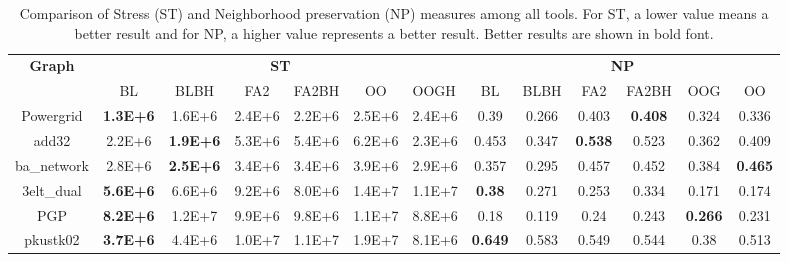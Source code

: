 \documentclass{vgtc}
\newcommand{\toolnameBH}{{BatchLayoutBH}}
\begin{document}

\begin{table}[!t]%
\caption{Comparison of Stress (ST) and Neighborhood preservation (NP) measures among all tools. For ST, a lower value means a better result and for NP, a higher value represents a better result. Better results are shown in bold font.}
\vspace{-4pt}
\centering
\begin{tabular}{|c|c|c|c|c|c|l|c|c|c|c|c|c|}
\hline
\multirow{2}{*}{\textbf{Graph}} & \multicolumn{6}{c|}{\textbf{ST}}                            & \multicolumn{6}{c|}{\textbf{NP}}            \\ \cline{2-13} 
                                & BL       & BLBH     & FA2       & FA2BH & OO & OOGH & BL & BLBH & FA2 & FA2BH & OOG & OO \\ \hline

Powergrid	&	\textbf{1.3E+6}	&	1.6E+6	&	2.4E+6	&	2.2E+6	&	2.5E+6	&	2.4E+6	&		0.39	&	0.266	&	0.403	&	\textbf{0.408}	&	0.324	&	0.336 \\ \hline

add32	&	2.2E+6	&	\textbf{1.9E+6}	&	5.3E+6	&	5.4E+6	&	6.2E+6	&	2.3E+6	&			0.453	&	0.347	&	\textbf{0.538}	&	0.523	&	0.362	&	0.409 \\ \hline

ba\_network	&	2.8E+6	&	\textbf{2.5E+6}	&	3.4E+6	&	3.4E+6	&	3.9E+6	&	2.9E+6	&			0.357	&	0.295	&	0.457	&	0.452	&	0.384	&	\textbf{0.465} \\ \hline

3elt\_dual	&	\textbf{5.6E+6}	&	6.6E+6	&	9.2E+6	&	8.0E+6	&	1.4E+7	&	1.1E+7	&			\textbf{0.38}	&	0.271	&	0.253	&	0.334	&	0.171	&	0.174 \\ \hline

PGP	&	\textbf{8.2E+6}	&	1.2E+7	&	9.9E+6	&	9.8E+6	&	1.1E+7	&	8.8E+6	&			0.18	&	0.119	&	0.24	&	0.243	&	\textbf{0.266}	&	0.231 \\ \hline

pkustk02	&	\textbf{3.7E+6}	&	4.4E+6	&	1.0E+7	&	1.1E+7	&	1.9E+7	&	8.1E+6	&			\textbf{0.649}	&	0.583	&	0.549	&	0.544	&	0.38	&	0.513 \\ \hline


\end{tabular}
\end{table}
\end{document}
